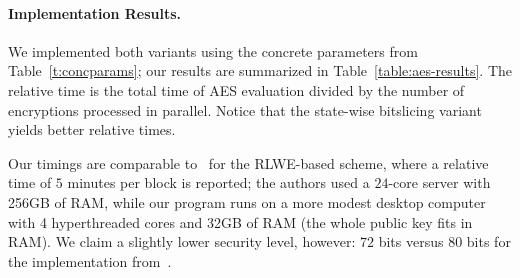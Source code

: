 \documentclass[11pt]{llncs}
\newcommand*\swbs{state-wise bitslicing\xspace}
\begin{document}
\paragraph{Implementation Results.} We implemented both variants
using the concrete parameters from Table~\ref{t:concparams}; our
results are summarized in 
Table~\ref{table:aes-results}. The 
relative time is the total time of AES evaluation divided  by the
number of encryptions processed in parallel. Notice that the \swbs variant
yields  better relative times. 

Our timings are comparable to~\cite{GHS2012c} for the RLWE-based scheme, where a relative time of $5$ minutes per block is
reported; the authors used a $24$-core server with 256GB of RAM, while
our program runs on a more modest desktop computer with 4 hyperthreaded cores and
32GB of RAM (the whole public key fits in RAM).
We claim a slightly lower security level, however: $72$ bits versus $80$
bits for the implementation from~\cite{GHS2012c}.

%


\end{document}
